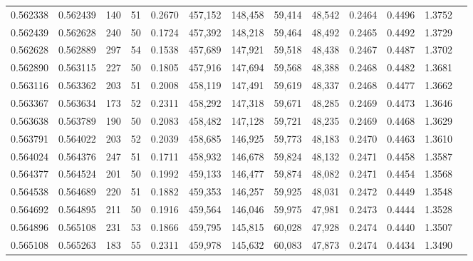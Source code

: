 \begin{tabular}{rrrrrrrrrrrrr}
0.562338 & 0.562439 &   140 &  51 &                                     0.2670 & 457,152 & 148,458 &  59,414 &  48,542 & 0.2464 & 0.4496 & 1.3752 \\
0.562439 & 0.562628 &   240 &  50 &                                     0.1724 & 457,392 & 148,218 &  59,464 &  48,492 & 0.2465 & 0.4492 & 1.3729 \\
0.562628 & 0.562889 &   297 &  54 &                                     0.1538 & 457,689 & 147,921 &  59,518 &  48,438 & 0.2467 & 0.4487 & 1.3702 \\
0.562890 & 0.563115 &   227 &  50 &                                     0.1805 & 457,916 & 147,694 &  59,568 &  48,388 & 0.2468 & 0.4482 & 1.3681 \\
0.563116 & 0.563362 &   203 &  51 &                                     0.2008 & 458,119 & 147,491 &  59,619 &  48,337 & 0.2468 & 0.4477 & 1.3662 \\
0.563367 & 0.563634 &   173 &  52 &                                     0.2311 & 458,292 & 147,318 &  59,671 &  48,285 & 0.2469 & 0.4473 & 1.3646 \\
0.563638 & 0.563789 &   190 &  50 &                                     0.2083 & 458,482 & 147,128 &  59,721 &  48,235 & 0.2469 & 0.4468 & 1.3629 \\
0.563791 & 0.564022 &   203 &  52 &                                     0.2039 & 458,685 & 146,925 &  59,773 &  48,183 & 0.2470 & 0.4463 & 1.3610 \\
0.564024 & 0.564376 &   247 &  51 &                                     0.1711 & 458,932 & 146,678 &  59,824 &  48,132 & 0.2471 & 0.4458 & 1.3587 \\
0.564377 & 0.564524 &   201 &  50 &                                     0.1992 & 459,133 & 146,477 &  59,874 &  48,082 & 0.2471 & 0.4454 & 1.3568 \\
0.564538 & 0.564689 &   220 &  51 &                                     0.1882 & 459,353 & 146,257 &  59,925 &  48,031 & 0.2472 & 0.4449 & 1.3548 \\
0.564692 & 0.564895 &   211 &  50 &                                     0.1916 & 459,564 & 146,046 &  59,975 &  47,981 & 0.2473 & 0.4444 & 1.3528 \\
0.564896 & 0.565108 &   231 &  53 &                                     0.1866 & 459,795 & 145,815 &  60,028 &  47,928 & 0.2474 & 0.4440 & 1.3507 \\
0.565108 & 0.565263 &   183 &  55 &                                     0.2311 & 459,978 & 145,632 &  60,083 &  47,873 & 0.2474 & 0.4434 & 1.3490 \\

\end{tabular}
